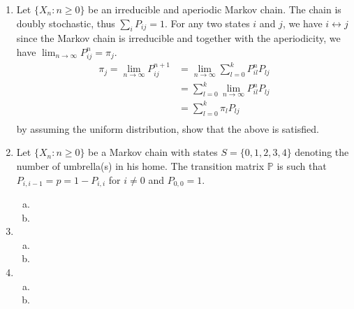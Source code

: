 \documentclass[a4paper,10pt]{article}
\theoremstyle{definition}
\begin{document}
\begin{enumerate}
\item Let $\{X_n:n\geq 0\}$ be an irreducible and aperiodic Markov chain. The chain is doubly stochastic, thus $\sum_{i}P_{ij}=1$. For any two states $i$ and $j$, we have $i \leftrightarrow j$ since the Markov chain is irreducible and together with the aperiodicity, we have $\lim_{n\to\infty}P_{ij}^n=\pi_j$. 
\begin{align*}
\pi_j=\lim_{n\to\infty}P^{n+1}_{ij}&=\lim_{n\to\infty}\sum_{l=0}^{k}P^{n}_{il}P_{lj}\\
&=\sum_{l=0}^{k}\lim_{n\to\infty}P^{n}_{il}P_{lj}\\
&=\sum_{l=0}^{k}\pi_{l}P_{lj}\\
\end{align*}
by assuming the uniform distribution, show that the above is satisfied.


\item Let $\{X_n:n\geq 0\}$ be a Markov chain with states $S=\{0,1,2,3,4\}$ denoting the number of umbrella(s) in his home. The transition matrix $\mathbb{P}$ is such that $P_{i,i-1}=p=1-P_{i,i}$ for $i\neq 0$ and $P_{0,0}=1$.


\begin{enumerate}[(a)]
\item
\item
\end{enumerate}
\item
\begin{enumerate}[(a)]
\item
\item
\end{enumerate}
\item
\begin{enumerate}[(a)]
\item
\item
\end{enumerate}
\end{enumerate}
\end{document}
